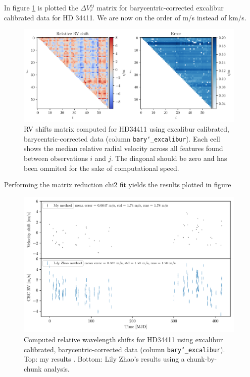 
In figure \ref*{fig:shift_matrix_barycentric} is plotted the $\Delta V_r^{ij}$ matrix for barycentric-corrected excalibur calibrated data for HD 34411. We are now on the order of m/s instead of km/s.

\begin{figure}%
    \begin{wide}  
        \includegraphics[width=\textwidth]{figures/shfits_matrix_bary.pdf}
        \caption{RV shifts matrix computed for HD34411 using excalibur calibrated, barycentric-corrected data (column \texttt{bary\char`_excalibur}). Each cell shows the median relative radial velocity across all features found between observations $i$ and $j$. The diagonal should be zero and has been ommited for the sake of computational speed.}
        \label{fig:shift_matrix_barycentric}
    \end{wide}
\end{figure}

Performing the matrix reduction chi2 fit yields the results plotted in figure 

\begin{figure}%
    \begin{wide}  
        \includegraphics[width=\textwidth]{figures/HD34411_barycentric_rv_vs_lily.pdf}
        \caption{Computed relative wavelength shifts for HD34411 using excalibur calibrated, barycentric-corrected data (column \texttt{bary\char`_excalibur}). Top: my results . Bottom: Lily Zhao's results using a chunk-by-chunk analysis. }
        \label{fig:RV_results_barycentric}
    \end{wide}
\end{figure}
